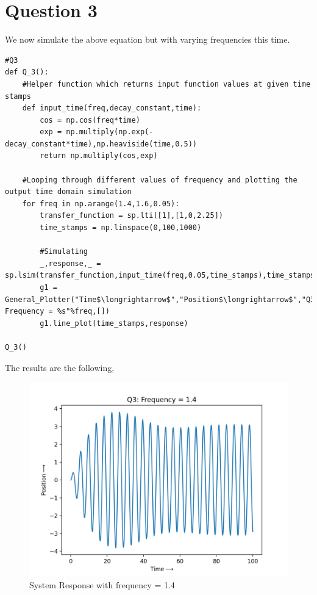\documentclass[11pt, a4paper]{article}
\begin{document}
\section{Question 3}
We now simulate the above equation but with varying frequencies this time.

\begin{lstlisting}
#Q3
def Q_3():
	#Helper function which returns input function values at given time stamps
	def input_time(freq,decay_constant,time):
		cos = np.cos(freq*time)
		exp = np.multiply(np.exp(-decay_constant*time),np.heaviside(time,0.5))
		return np.multiply(cos,exp)

	#Looping through different values of frequency and plotting the output time domain simulation
	for freq in np.arange(1.4,1.6,0.05):
		transfer_function = sp.lti([1],[1,0,2.25])
		time_stamps = np.linspace(0,100,1000)

		#Simulating
		_,response,_ = sp.lsim(transfer_function,input_time(freq,0.05,time_stamps),time_stamps)
		g1 = General_Plotter("Time$\longrightarrow$","Position$\longrightarrow$","Q3: Frequency = %s"%freq,[])
		g1.line_plot(time_stamps,response)

Q_3()
\end{lstlisting}
The results are the following,
\begin{figure}[tbh!]
\centering
\includegraphics[scale=0.6]{Q3_1.png}
\caption{System Response with frequency = 1.4}
\label{fig:System Response with frequency = 1.4}
\end{figure}
\end{document}
